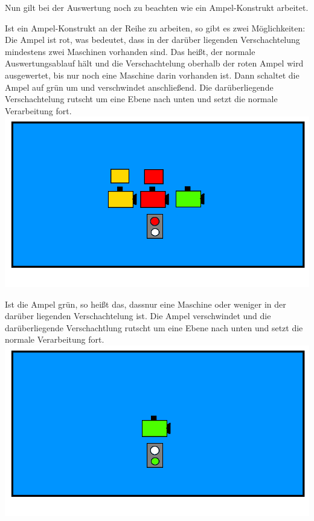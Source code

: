 \documentclass{scrartcl}
\begin{document}
\begin{description}
			Nun gilt bei der Auswertung noch zu beachten wie ein Ampel-Konstrukt arbeitet.\\
			
		\begin{minipage}{1\textwidth}
			Ist ein Ampel-Konstrukt an der Reihe zu arbeiten, so gibt es zwei Möglichkeiten:\\
			Die Ampel ist rot, was bedeutet, dass in der darüber liegenden Verschachtelung mindestens zwei Maschinen vorhanden sind. Das heißt, der normale Auswertungsablauf hält und die Verschachtelung oberhalb der roten Ampel wird ausgewertet, bis nur noch eine Maschine darin vorhanden ist. Dann schaltet die Ampel auf grün um und verschwindet anschließend. Die darüberliegende Verschachtelung rutscht um eine Ebene nach unten und setzt die normale Verarbeitung fort.\\ 
			\includegraphics[scale=0.5]{assets/AuswertungAmpelRot}
		\end{minipage}
		
		\begin{minipage}{1\textwidth}
			Ist die Ampel grün, so heißt das, dassnur eine Maschine oder weniger in der darüber liegenden Verschachtelung ist. Die Ampel verschwindet und die darüberliegende Verschachtlung rutscht um eine Ebene nach unten und setzt die normale Verarbeitung fort.\\  
			\includegraphics[scale=0.5]{assets/AsuwertungAmpelGrun}
		\end{minipage}


\end{description}
\end{document}
